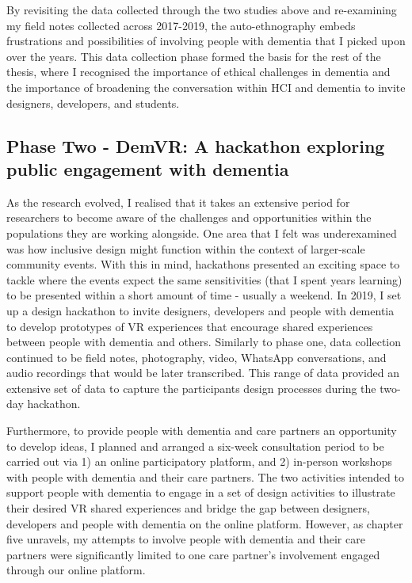 By revisiting the data collected through the two studies above and re-examining my field notes collected across 2017-2019, the auto-ethnography embeds frustrations and possibilities of involving people with dementia that I picked upon over the years. This data collection phase formed the basis for the rest of the thesis, where I recognised the importance of ethical challenges in dementia and the importance of broadening the conversation within HCI and dementia to invite designers, developers, and students. 

\subsection{Phase Two - DemVR: A hackathon exploring public engagement with dementia}

As the research evolved, I realised that it takes an extensive period for researchers to become aware of the challenges and opportunities within the populations they are working alongside. One area that I felt was underexamined was how inclusive design might function within the context of larger-scale community events. With this in mind, hackathons presented an exciting space to tackle where the events expect the same sensitivities (that I spent years learning) to be presented within a short amount of time - usually a weekend. 
In 2019, I set up a design hackathon to invite designers, developers and people with dementia to develop prototypes of VR experiences that encourage shared experiences between people with dementia and others. Similarly to phase one, data collection continued to be field notes, photography, video, WhatsApp conversations, and audio recordings that would be later transcribed. This range of data provided an extensive set of data to capture the participants design processes during the two-day hackathon. 

Furthermore, to provide people with dementia and care partners an opportunity to develop ideas, I planned and arranged a six-week consultation period to be carried out via 1) an online participatory platform, and 2) in-person workshops with people with dementia and their care partners. The two activities intended to support people with dementia to engage in a set of design activities to illustrate their desired VR shared experiences and bridge the gap between designers, developers and people with dementia on the online platform. However, as chapter five unravels, my attempts to involve people with dementia and their care partners were significantly limited to one care partner’s involvement engaged through our online platform. 

